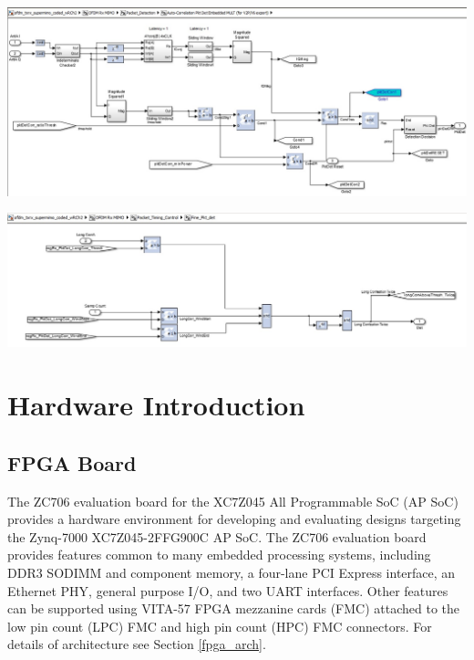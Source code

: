 \begin{center}
\includegraphics[width=\textwidth]{content/fig/autocorrblock.JPG}
\label{autocorrblock}
\end{center}

\begin{center}
\includegraphics[width=\textwidth]{content/fig/fine_packetDetect.JPG}
\label{autocorrblock}
\end{center}

\section{Hardware Introduction}
\subsection{FPGA Board}

The ZC706 evaluation board for the XC7Z045 All Programmable SoC (AP SoC) provides a hardware environment for developing and evaluating designs targeting the Zynq-7000 XC7Z045-2FFG900C AP SoC. The ZC706 evaluation board provides features common to
many embedded processing systems, including DDR3 SODIMM and component memory, a four-lane PCI Express interface, an Ethernet PHY, general purpose I/O, and two UART interfaces. Other features can be supported using VITA-57 FPGA mezzanine cards (FMC) attached to the low pin count (LPC) FMC and high pin count (HPC) FMC connectors. For details of architecture see Section \ref{fpga_arch}.\\

